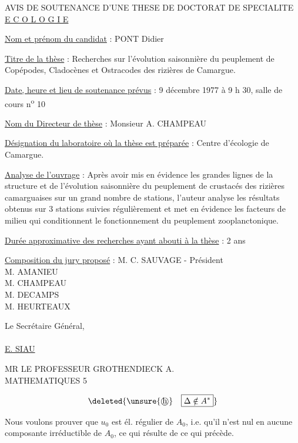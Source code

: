 AVIS DE SOUTENANCE D'UNE THESE DE DOCTORAT DE SPECIALITE\\ \uline{E C O L O G I E}

\uline{Nom et prénom du candidat} : PONT Didier

\uline{Titre de la thèse} : Recherches sur l'évolution saisonnière du peuplement de Copépodes, Cladocènes et Ostracodes des rizières de Camargue.

\uline{Date, heure et lieu de soutenance prévus} : 9 décembre 1977 à 9 h 30, salle de cours n\textsuperscript{o} 10

\uline{Nom du Directeur de thèse} : Monsieur A. CHAMPEAU

\uline{Désignation du laboratoire où la thèse est préparée} : Centre d'écologie de Camargue.

\uline{Analyse de l'ouvrage} : Après avoir mis en évidence les grandes lignes de la structure et de l'évolution saisonnière du peuplement de crustacés des rizières camarguaises sur un grand nombre de stations, l'auteur analyse les résultats obtenus sur 3 stations suivies régulièrement et met en évidence les facteurs de milieu qui conditionnent le fonctionnement du peuplement zooplanctonique.

\uline{Durée approximative des recherches ayant abouti à la thèse} : 2 ans

\uline{Composition du jury proposé} : M. C. SAUVAGE - Président\\ M. AMANIEU\\ M. CHAMPEAU\\ M. DECAMPS\\ M. HEURTEAUX

Le Secrétaire Général,\\
\\
\uline{E. SIAU}

MR LE PROFESSEUR GROTHENDIECK A.\\ MATHEMATIQUES \hfill 5

\[
\deleted{\unsure{\text{\textcircled{h}}}\quad\boxed{\Delta\notin A^*}}
\]

Nous voulons prouver que $u_0$ est él. régulier de $A_0$,  i.e. qu'il n'est nul en aucune composante irréductible de $A_0$, ce qui résulte de ce qui précède.


